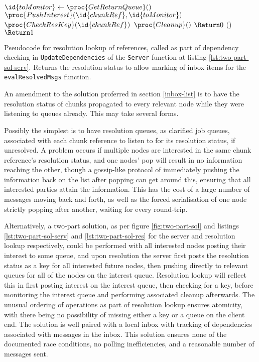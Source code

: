 \documentclass[a4paper,10pt]{article}
\begin{document}
\begin{lstclrs}
\begin{codebox}
	\li \(\id{toMonitor} \gets \proc{GetReturnQueue}()\)
	\li \(\proc{PushInterest}(\id{chunkRef}, \id{toMonitor})\)
	\li \If \(\proc{CheckResKey}(\id{chunkRef})\)
	\li \Then
	\(\proc{Cleanup}()\)
	\li \(\Return 0\)
	\li \Else
	()
	\li \(\Return 1\)
\end{codebox}
	\caption{\label{lst:two-part-sol-res}Pseudocode for resolution lookup
	of references, called as part of dependency checking in
	\texttt{UpdateDependencies} of the \texttt{Server} function at listing
	\ref{lst:two-part-sol-serv}. Returns the resolution status to allow
	marking of inbox items for the \texttt{evalResolvedMsgs} function.}
\end{lstclrs}

An amendment to the solution proferred in section \ref{inbox-list} is to have
the resolution status of chunks propagated to every relevant node while they
were listening to queues already.
This may take several forms.

Possibly the simplest is to have resolution queues, as clarified job queues,
associated with each chunk reference to listen to for its resolution status, if
unresolved.
A problem occurs if multiple nodes are interested in the same chunk reference's
resolution status, and one nodes' pop will result in no information reaching
the other, though a gossip-like protocol of immediately pushing the information
back on the list after popping can get around this, ensuring that all
interested parties attain the information.
This has the cost of a large number of messages moving back and forth, as well
as the forced serialisation of one node strictly popping after another, waiting
for every round-trip.

Alternatively, a two-part solution, as per figure \ref{fig:two-part-sol} and
listings \ref{lst:two-part-sol-serv} and  \ref{lst:two-part-sol-res} for the
server and resolution lookup respectively, could be performed with all
interested nodes posting their interest to some queue, and upon resolution the
server first posts the resolution status as a key for all interested future
nodes, then pushing directly to relevant queues for all of the nodes on the
interest queue.
Resolution lookup will reflect this in first posting interest on the interest
queue, then checking for a key, before monitoring the interest queue and
performing associated cleanup afterwards.
The unusual ordering of operations as part of resolution lookup ensures
atomicity, with there being no possibility of missing either a key or a queue
on the client end.
The solution is well paired with a local inbox with tracking of dependencies
associated with messages in the inbox.
This solution ensures none of the documented race conditions, no polling
inefficiencies, and a reasonable number of messages sent.
\end{document}
